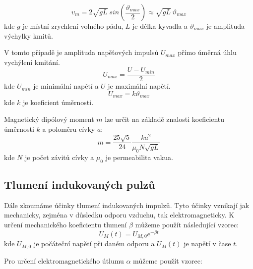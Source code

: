 \documentclass[a4paper,11pt]{article}
\begin{document}
    \begin{minipage}[t]{0.5\textwidth} 
                \begin{equation}
                    \upsilon_m = 2\sqrt{gL} ~sin\left(\frac{\vartheta_{max}}{2}\right) \approx \sqrt{gL} ~\vartheta_{max}
                \end{equation}
                kde $g$ je místní zrychlení volného pádu, $L$ je délka kyvadla a $\vartheta_{max}$ je amplituda výchylky kmitů.  
                \par V tomto případě je amplituda napěťových impulsů $U_{max}$ přímo úměrná úhlu vychýlení kmitání. 
                \begin{equation}
                    U_{max} = \frac{U - U_{min}}{2}
                \end{equation}
                kde $U_{min}$ je minimální napětí a $U$ je maximální napětí. 
                \begin{equation}
                    U_{max} = k\vartheta_{max}
                \end{equation}
                kde $k$ je koeficient úměrnosti.
                \par Magnetický dipólový moment $m$ lze určit na základě znalosti koeficientu úměrnosti $k$ a poloměru cívky $a$:
                \begin{equation}
                    m = \frac{25\sqrt{5}}{24} \frac{k a^2}{\mu_0 N \sqrt{gL}}
                \end{equation}
                kde $N$ je počet závitů cívky a $\mu_0$ je permeabilita vakua. 
            \subsection{Tlumení indukovaných pulzů}
                Dále zkoumáme účinky tlumení indukovaných impulzů. Tyto účinky vznikají jak mechanicky, zejména v důsledku odporu vzduchu, tak elektromagneticky. 
                K určení mechanického koeficientu tlumení $\beta$ můžeme použít následující vzorec: 
                \begin{equation}
                    U_M(t) = U_{M,0}e^{-\beta t}
                \end{equation}
                kde $U_{M,0}$ je počáteční napětí při daném odporu a $U_M(t)$ je napětí v čase $t$.
                \par Pro určení elektromagnetického útlumu $\alpha$ můžeme použít vzorec: 
    \end{minipage}
    \hspace{10pt}
\end{document}
